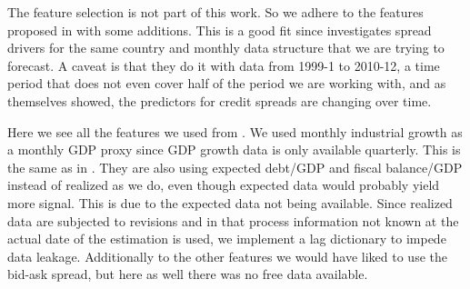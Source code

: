 The feature selection is not part of this work. So we adhere to the
features proposed in \textcite[ECB WP 1781]{afonso2015} with some
additions. This is a good fit since \textcite[ECB WP 1781]{afonso2015}
investigates spread drivers for the same country and monthly data structure
that we are trying to forecast. A caveat is that they do it with data from
1999-1 to 2010-12, a time period that does not even cover half of the
period we are working with, and as \textcite[ECB WP 1781]{afonso2015}
themselves showed, the predictors for credit spreads are changing over
time.

Here we see all the features we used from \textcite[ECB WP 1781]{afonso2015}.
We used monthly industrial growth as a monthly GDP proxy since GDP growth
data is only available quarterly. This is the same as in
\textcite[ECB WP 1781]{afonso2015}. They are also using expected debt/GDP and 
fiscal balance/GDP instead of realized as we do, even though
expected data would probably yield more signal. This is due to the expected
data not being available. Since realized data are subjected to revisions
and in that process information not known at the actual date of the
estimation is used, we implement a lag dictionary to impede data leakage.
Additionally to the other features we would have liked to use the
bid-ask spread, but here as well there was no free data available.

